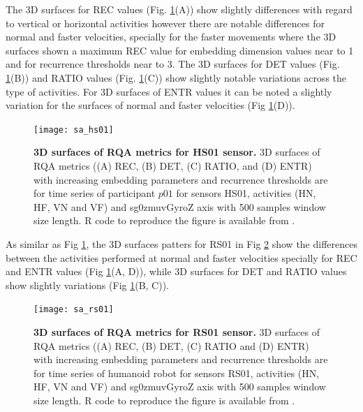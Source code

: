 The 3D surfaces for REC values (Fig. \ref{fig:topo_sa_hs01}(A))
show slightly differences with regard to vertical or horizontal activities
however there are notable differences for normal and faster velocities, 
specially for the faster movements where the 3D surfaces shown a maximum
REC value for embedding dimension values near to 1 and for recurrence 
thresholds near to 3. 
The 3D surfaces for DET values  
(Fig. \ref{fig:topo_sa_hs01}(B)) and RATIO values 
(Fig. \ref{fig:topo_sa_hs01}(C)) show slightly notable variations across 
the type of activities. 
For 3D surfaces of ENTR values it can be noted a slightly variation for
the surfaces of normal and faster velocities (Fig \ref{fig:topo_sa_hs01}(D)).
\begin{figure}[!ht]
\centering
\texttt{[image: sa\_hs01]}
    \caption{
	{\bf 3D surfaces of RQA metrics for HS01 sensor.}
	3D surfaces of RQA metrics ((A) REC, (B) DET, (C) RATIO, and (D) ENTR) 
	with increasing embedding parameters and recurrence thresholds 
	are for time series of participant $p01$ for 
	sensors HS01, activities (HN, HF, VN and VF) and 
	sg0zmuvGyroZ axis with 500 samples window size length. 
	R code to reproduce the figure is available from \cite{hwum2018}.
       }
\label{fig:topo_sa_hs01}
\end{figure}

As similar as Fig \ref{fig:topo_sa_hs01}, the 3D surfaces patters 
for RS01 in Fig \ref{fig:topo_sa_rs01} show the differences between 
the activities performed at normal and faster velocities
specially for REC and ENTR values (Fig \ref{fig:topo_sa_hs01}(A, D)),
while 3D surfaces for DET and RATIO values show slightly variations
(Fig \ref{fig:topo_sa_hs01}(B, C)).
\begin{figure}[!ht]
\centering
\texttt{[image: sa\_rs01]}
    \caption{
	{\bf 3D surfaces of RQA metrics for RS01 sensor.}
	3D surfaces of RQA metrics ((A) REC, (B) DET, (C) RATIO and (D) ENTR) 
	with increasing embedding parameters and recurrence thresholds 
	are for time series of humanoid robot for 
	sensors RS01, activities (HN, HF, VN and VF) and 
	sg0zmuvGyroZ axis with 500 samples window size length. 
	R code to reproduce the figure is available from \cite{hwum2018}.
       }
\label{fig:topo_sa_rs01}
\end{figure}


